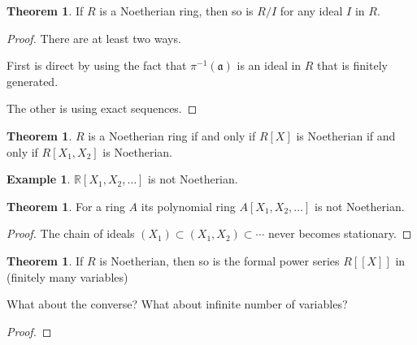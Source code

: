 \documentclass[a4paper]{book}
\theoremstyle{definition}
\newtheorem{example}{Example}[definition]
\newtheorem{theorem}[definition]{Theorem}
\begin{document}
\begin{thmbox}
    \begin{theorem}
        If \(R\) is a Noetherian ring, then so is \(R / I\) for any ideal \(I\) in \(R\).
    \end{theorem}
\end{thmbox}
\begin{proof}
    There are at least two ways.

    First is direct by using the fact that \(\pi^{-1}(\mathfrak{a})\) is an ideal in \(R\) that is finitely generated.

    The other is using exact sequences.
\end{proof}

\begin{thmbox}
    \begin{theorem}
        \(R\) is a Noetherian ring if and only if \(R[X]\) is Noetherian if and only if \(R[X_1, X_2]\) is Noetherian.
    \end{theorem}
\end{thmbox}

\begin{exmbox}
    \begin{example}
        \(\mathbb{R}[X_1, X_2, \ldots]\) is not Noetherian.
    \end{example}
\end{exmbox}

\begin{thmbox}
    \begin{theorem}
        For a ring \(A\) its polynomial ring \(A[X_1, X_2, \ldots]\) is not Noetherian.
    \end{theorem}
\end{thmbox}
\begin{proof}
    The chain of ideals \((X_1) \subset (X_1, X_2) \subset \cdots\) never becomes stationary.
\end{proof}

\begin{thmbox}
    \begin{theorem}
        If \(R\) is Noetherian, then so is the formal power series \(R[[X]]\) in (finitely many variables)
    \end{theorem}
\end{thmbox}
What about the converse?
What about infinite number of variables?

\begin{proof}
    
\end{proof}
\end{document}
